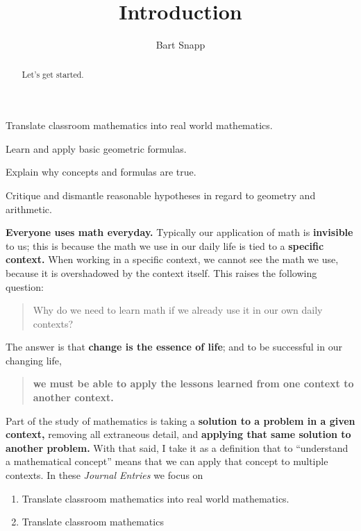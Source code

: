 \documentclass[handout,nooutcomes,noauthor]{ximera}
\title{Introduction}
\author{Bart Snapp}
\begin{document}
\begin{abstract}
  Let's get started.
\end{abstract}
\maketitle


\begin{listSectionOutcomes}
\item Translate classroom mathematics into real world mathematics. %
\item Learn and apply basic geometric formulas.
\item Explain why concepts and formulas are true.
\item Critique and dismantle reasonable hypotheses in regard to
  geometry and arithmetic.
\end{listSectionOutcomes}




\textbf{Everyone uses math everyday.}  Typically our application of
math is \textbf{invisible} to us; this is because the math we use in
our daily life is tied to a \textbf{specific context.} When working in
a specific context, we cannot see the math we use, because it is
overshadowed by the context itself.  This raises the following
question:
\begin{quote}
  Why do we need to learn math if we already use it in our own daily
  contexts?
\end{quote}
The answer is that \textbf{change is the essence of life}; and to be
successful in our changing life, 
\begin{quote}
  \textbf{we must be able to apply the lessons learned from one
    context to another context.}
\end{quote}
Part of the study of mathematics is taking a \textbf{solution to a
  problem in a given context,} removing all extraneous detail, and
\textbf{applying that same solution to another problem.} With that
said, I take it as a definition that to ``understand a mathematical
concept'' means that we can apply that concept to multiple contexts.
In these \textit{Journal Entries} we focus on
\begin{enumerate}
\item Translate classroom mathematics into real world mathematics.
\item Translate classroom mathematics 
\end{enumerate}
\end{document}
